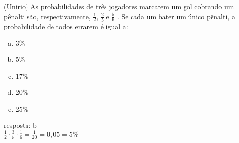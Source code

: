 \begin{ex}
(Unirio) As probabilidades de três jogadores marcarem um gol cobrando um pênalti são, respectivamente, $\frac{1}{2}$, $\frac{2}{5}$  e $\frac{5}{6}$ . Se cada um bater um único pênalti, a probabilidade de todos errarem é igual a:
   \begin{enumerate}[(a)]
   \item 3\%
   \item 5\%
   \item 17\%
   \item 20\%
   \item 25\%
   \end{enumerate}
     \begin{sol}
       resposta: b \\
       $\frac{1}{2}\cdot\frac{3}{5}\cdot \frac{1}{6}=\frac{1}{20}=0,05=5\%$
     \end{sol}
\end{ex}